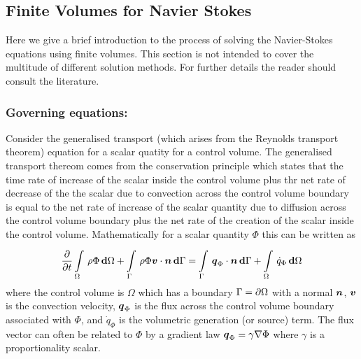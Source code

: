 \subsection{Finite Volumes for Navier Stokes}

Here we give a brief introduction to the process of solving the Navier-Stokes
equations using finite volumes. This section is not intended to cover the
multitude of different solution methods. For further details the reader should
consult the literature.

\subsubsection{Governing equations:}

Consider the generalised transport (which arises from the Reynolds transport
theorem) equation for a scalar quatity for a control volume. The generalised
transport thereom comes from the conservation principle which states that the
time rate of increase of the scalar inside the control volume plus thr net rate
of decrease of the the scalar due to convection across the control volume
boundary is equal to the net rate of increase of the scalar quantity due to
diffusion across the control volume boundary plus the net rate of the creation
of the scalar inside the control volume. Mathematically for a scalar quantity
$\Phi$ this can be written as
\begin{equation}
  \delby{}{t}\gint{\Omega}{}{\rho\Phi}{\Omega}+\gint{\Gamma}{}{\dotprod{\rho\Phi\vectr{v}}{\vectr{n}}}{\Gamma}=\gint{\Gamma}{}{\dotprod{\vectr{q}_{\Phi}}{\vectr{n}}}{\Gamma}+\gint{\Omega}{}{\dot{q}_{\Phi}}{\Omega}
  \label{eqn:integralgenscalartransport}
\end{equation}
where the control volume is $\Omega$ which has a boundary
$\Gamma= \partial{\Omega} $ with a normal $\boldsymbol{n}$, $\boldsymbol{v}$ is the
convection velocity, $\boldsymbol{q}_{\Phi}$ is the flux across the control volume
boundary associated with $\Phi$, and $\dot{q}_{\Phi}$ is the volumetric
generation (or source) term. The flux vector can often be related to $\Phi$ by
a gradient law \ie $\vectr{q}_{\Phi}=\gamma\gradient{}{\Phi}$ where $\gamma$
is a proportionality scalar. 


